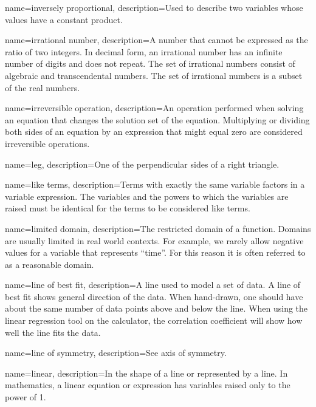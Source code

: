  {
	name=inversely proportional,
	description={Used to describe two variables whose values have a constant product.}
}

 {
	name=irrational number,
	description={A number that cannot be expressed as the ratio of two integers. In decimal form, an irrational number has an infinite number of digits and does not repeat. The set of irrational numbers consist of algebraic and transcendental numbers. The set of irrational numbers is a subset of the real numbers.}
}

 {
	name=irreversible operation,
	description={An operation performed when solving an equation that changes the solution set of the equation. Multiplying or dividing both sides of an equation by an expression that might equal zero are considered irreversible operations.}
}

 {
	name=leg,
	description={One of the perpendicular sides of a right triangle.}
}

 {
	name=like terms,
	description={Terms with exactly the same variable factors in a variable expression. The variables and the powers to which the variables are raised must be identical for the terms to be considered like terms.}
}

 {
	name=limited domain,
	description={The restricted domain of a function. Domains are usually limited in real world contexts. For example, we rarely allow negative values for a variable that represents ``time''. For this reason it is often referred to as a reasonable domain.}
}

 {
	name=line of best fit,
	description={A line used to model a set of data. A line of best fit shows general direction of the data. When hand-drawn, one should have about the same number of data points above and below the line. When using the linear regression tool on the 
calculator, the correlation coefficient will show how well the line fits the data.}
}

 {
	name=line of symmetry,
	description={See \gls{axis of symmetry}.}
}

 {
	name=linear,
	description={In the shape of a line or represented by a line. In mathematics, a linear equation or expression has variables raised only to the power of 1.}
}


